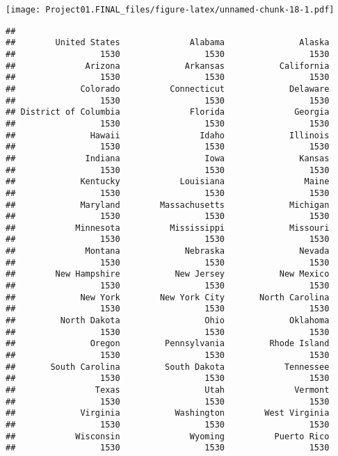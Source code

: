 \documentclass[
]{article}
\newenvironment{Shaded}{\begin{snugshade}}{\end{snugshade}}
\newcommand{\FunctionTok}[1]{\textcolor[rgb]{0.00,0.00,0.00}{#1}}
\newcommand{\NormalTok}[1]{#1}
\newcommand{\SpecialCharTok}[1]{\textcolor[rgb]{0.00,0.00,0.00}{#1}}
\begin{document}
\texttt{[image: Project01.FINAL\_files/figure-latex/unnamed-chunk-18-1.pdf]}

\begin{Shaded}
\end{Shaded}

\begin{verbatim}
## 
##        United States              Alabama               Alaska 
##                 1530                 1530                 1530 
##              Arizona             Arkansas           California 
##                 1530                 1530                 1530 
##             Colorado          Connecticut             Delaware 
##                 1530                 1530                 1530 
## District of Columbia              Florida              Georgia 
##                 1530                 1530                 1530 
##               Hawaii                Idaho             Illinois 
##                 1530                 1530                 1530 
##              Indiana                 Iowa               Kansas 
##                 1530                 1530                 1530 
##             Kentucky            Louisiana                Maine 
##                 1530                 1530                 1530 
##             Maryland        Massachusetts             Michigan 
##                 1530                 1530                 1530 
##            Minnesota          Mississippi             Missouri 
##                 1530                 1530                 1530 
##              Montana             Nebraska               Nevada 
##                 1530                 1530                 1530 
##        New Hampshire           New Jersey           New Mexico 
##                 1530                 1530                 1530 
##             New York        New York City       North Carolina 
##                 1530                 1530                 1530 
##         North Dakota                 Ohio             Oklahoma 
##                 1530                 1530                 1530 
##               Oregon         Pennsylvania         Rhode Island 
##                 1530                 1530                 1530 
##       South Carolina         South Dakota            Tennessee 
##                 1530                 1530                 1530 
##                Texas                 Utah              Vermont 
##                 1530                 1530                 1530 
##             Virginia           Washington        West Virginia 
##                 1530                 1530                 1530 
##            Wisconsin              Wyoming          Puerto Rico 
##                 1530                 1530                 1530
\end{verbatim}
\end{document}
